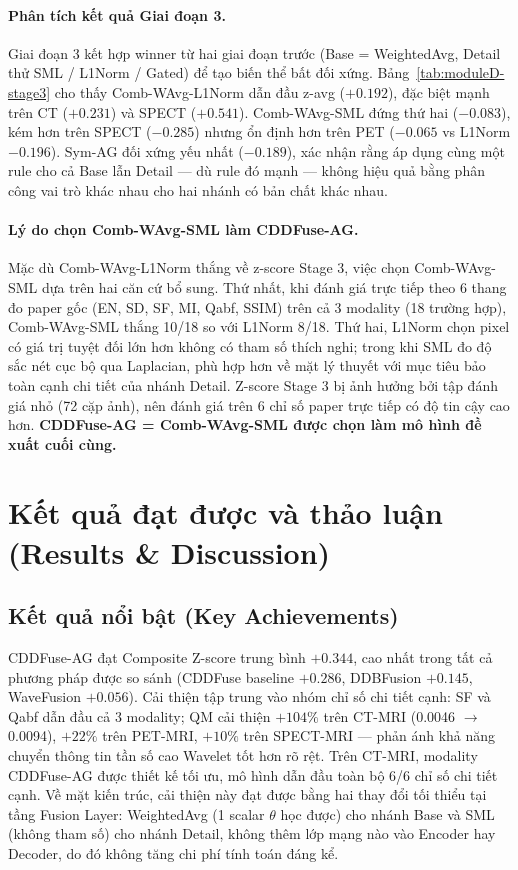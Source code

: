 \paragraph{Phân tích kết quả Giai đoạn 3.}
Giai đoạn 3 kết hợp winner từ hai giai đoạn trước (Base = WeightedAvg, Detail thử SML / L1Norm / Gated) để tạo biến thể bất đối xứng. Bảng~\ref{tab:moduleD-stage3} cho thấy Comb-WAvg-L1Norm dẫn đầu z-avg ($+0.192$), đặc biệt mạnh trên CT ($+0.231$) và SPECT ($+0.541$). Comb-WAvg-SML đứng thứ hai ($-0.083$), kém hơn trên SPECT ($-0.285$) nhưng ổn định hơn trên PET ($-0.065$ vs L1Norm $-0.196$). Sym-AG đối xứng yếu nhất ($-0.189$), xác nhận rằng áp dụng cùng một rule cho cả Base lẫn Detail --- dù rule đó mạnh --- không hiệu quả bằng phân công vai trò khác nhau cho hai nhánh có bản chất khác nhau.

\paragraph{Lý do chọn Comb-WAvg-SML làm CDDFuse-AG.}
Mặc dù Comb-WAvg-L1Norm thắng về z-score Stage 3, việc chọn Comb-WAvg-SML dựa trên hai căn cứ bổ sung. Thứ nhất, khi đánh giá trực tiếp theo 6 thang đo paper gốc (EN, SD, SF, MI, Qabf, SSIM) trên cả 3 modality (18 trường hợp), Comb-WAvg-SML thắng 10/18 so với L1Norm 8/18. Thứ hai, L1Norm chọn pixel có giá trị tuyệt đối lớn hơn không có tham số thích nghi; trong khi SML đo độ sắc nét cục bộ qua Laplacian, phù hợp hơn về mặt lý thuyết với mục tiêu bảo toàn cạnh chi tiết của nhánh Detail. Z-score Stage 3 bị ảnh hưởng bởi tập đánh giá nhỏ (72 cặp ảnh), nên đánh giá trên 6 chỉ số paper trực tiếp có độ tin cậy cao hơn. \textbf{CDDFuse-AG = Comb-WAvg-SML được chọn làm mô hình đề xuất cuối cùng.}

\section{Kết quả đạt được và thảo luận (Results \& Discussion)}
\label{sec:discussion}

\subsection{Kết quả nổi bật (Key Achievements)}

CDDFuse-AG đạt Composite Z-score trung bình $+0.344$, cao nhất trong tất cả phương pháp được so sánh (CDDFuse baseline $+0.286$, DDBFusion $+0.145$, WaveFusion $+0.056$). Cải thiện tập trung vào nhóm chỉ số chi tiết cạnh: SF và Qabf dẫn đầu cả 3 modality; QM cải thiện $+104\%$ trên CT-MRI (0.0046 $\to$ 0.0094), $+22\%$ trên PET-MRI, $+10\%$ trên SPECT-MRI --- phản ánh khả năng chuyển thông tin tần số cao Wavelet tốt hơn rõ rệt. Trên CT-MRI, modality CDDFuse-AG được thiết kế tối ưu, mô hình dẫn đầu toàn bộ 6/6 chỉ số chi tiết cạnh. Về mặt kiến trúc, cải thiện này đạt được bằng hai thay đổi tối thiểu tại tầng Fusion Layer: WeightedAvg (1 scalar $\theta$ học được) cho nhánh Base và SML (không tham số) cho nhánh Detail, không thêm lớp mạng nào vào Encoder hay Decoder, do đó không tăng chi phí tính toán đáng kể.

